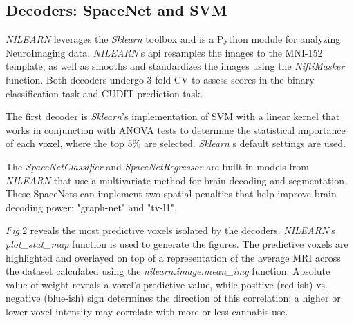 \documentclass[conference]{IEEEtran}
\begin{document}
\subsection{Decoders: SpaceNet and SVM}

\textit{NILEARN} leverages the \textit{Sklearn} toolbox \cite{SKLEARN} and is a Python module for analyzing NeuroImaging data. \textit{NILEARN}’s api resamples the images to the MNI-152 template, as well as smooths and standardizes the images using the \textit{NiftiMasker} function. Both decoders undergo 3-fold CV to assess scores in the binary classification task and CUDIT prediction task. 

The first decoder is \textit{Sklearn}’s implementation of SVM with a linear kernel that works in conjunction with ANOVA tests to determine the statistical importance of each voxel, where the top 5\% are selected. \textit{Sklearn}
s default settings are used. 

The \textit{SpaceNetClassifier} and \textit{SpaceNetRegressor} are built-in models from \textit{NILEARN} that use a multivariate method for brain decoding and segmentation. These SpaceNets can implement two spatial penalties that help improve brain decoding power: "graph-net" and "tv-l1". 

\textit{Fig.}2 reveals the most predictive voxels isolated by the decoders. \textit{NILEARN}'s \textit{plot\_stat\_map} function is used to generate the figures. The predictive voxels are highlighted and overlayed on top of a representation of the average MRI across the dataset calculated using the \textit{nilearn.image.mean\_img} function. Absolute value of weight reveals a voxel’s predictive value, while positive (red-ish) vs. negative (blue-ish) sign determines the direction of this correlation; a higher or lower voxel intensity may correlate with more or less cannabis use.
\end{document}

